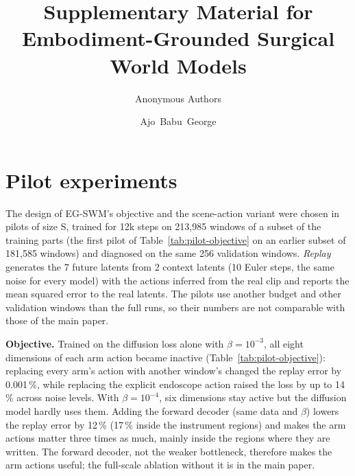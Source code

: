 \documentclass[journal]{IEEEtran}
\newcommand{\method}{EG-SWM}
\begin{document}
\title{Supplementary Material for\\ Embodiment-Grounded Surgical World Models}
\ifreview\author{Anonymous Authors}\else\author{Ajo~Babu~George}\fi
{}
\maketitle

\section{Pilot experiments}\label{sec:pilots}
The design of \method{}'s objective and the scene-action variant were chosen in pilots of size S, trained for 12k steps on 213,985 windows of a subset of the training parts (the first pilot of Table~\ref{tab:pilot-objective} on an earlier subset of 181,585 windows) and diagnosed on the same 256 validation windows. \emph{Replay} generates the 7 future latents from 2 context latents (10 Euler steps, the same noise for every model) with the actions inferred from the real clip and reports the mean squared error to the real latents. The pilots use another budget and other validation windows than the full runs, so their numbers are not comparable with those of the main paper.

\textbf{Objective.} Trained on the diffusion loss alone with $\beta=10^{-3}$, all eight dimensions of each arm action became inactive (Table~\ref{tab:pilot-objective}): replacing every arm's action with another window's changed the replay error by 0.001\,\%, while replacing the explicit endoscope action raised the loss by up to 14\,\% across noise levels. With $\beta=10^{-4}$, six dimensions stay active but the diffusion model hardly uses them. Adding the forward decoder (same data and $\beta$) lowers the replay error by 12\,\% (17\,\% inside the instrument regions) and makes the arm actions matter three times as much, mainly inside the regions where they are written. The forward decoder, not the weaker bottleneck, therefore makes the arm actions useful; the full-scale ablation without it is in the main paper.
\end{document}
